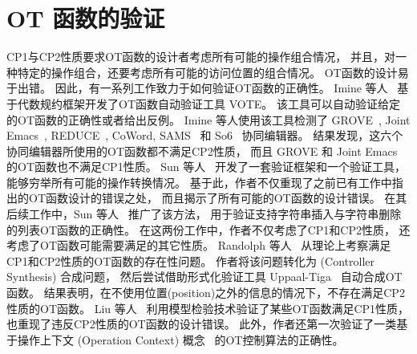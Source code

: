 \section{OT 函数的验证}

CP1与CP2性质要求OT函数的设计者考虑所有可能的操作组合情况，
并且，对一种特定的操作组合，还要考虑所有可能的访问位置的组合情况。
OT函数的设计易于出错。
因此，有一系列工作致力于如何验证OT函数的正确性。
Imine 等人~\cite{Imine:TCS06} 基于代数规约框架开发了OT函数自动验证工具 VOTE。
该工具可以自动验证给定的OT函数的正确性或者给出反例。
Imine 等人使用该工具检测了 GROVE~\cite{Ellis:SIGMOD89}, 
Joint Emacs~\cite{Ressel:CSCW96}, REDUCE~\cite{Sun:TOCHI98}, 
CoWord, SAMS~\cite{Molli:CSCW02} 和 So6~\cite{Sun:CSCW04} 协同编辑器。
结果发现，这六个协同编辑器所使用的OT函数都不满足CP2性质，
而且 GROVE 和 Joint Emacs 的OT函数也不满足CP1性质。
Sun 等人~\cite{Sun:CSCW14} 开发了一套验证框架和一个验证工具，
能够穷举所有可能的操作转换情况。
基于此，作者不仅重现了之前已有工作中指出的OT函数设计的错误之处，
而且揭示了所有可能的OT函数的设计错误。
在其后续工作中，Sun 等人~\cite{Sun:CSCW17} 推广了该方法，
用于验证支持字符串插入与字符串删除的列表OT函数的正确性。
在这两份工作中，作者不仅考虑了CP1和CP2性质，
还考虑了OT函数可能需要满足的其它性质。
Randolph 等人~\cite{Randolph:arXiv13} 从理论上考察满足CP1和CP2性质的OT函数的存在性问题。
作者将该问题转化为 (Controller Synthesis) 合成问题，
然后尝试借助形式化验证工具 Uppaal-Tiga~\cite{Cassez:CONCUR05} 自动合成OT函数。
结果表明，在不使用位置(position)之外的信息的情况下，不存在满足CP2性质的OT函数。
Liu 等人~\cite{Liu:FM14} 利用模型检验技术验证了某些OT函数满足CP1性质，
也重现了违反CP2性质的OT函数的设计错误。
此外，作者还第一次验证了一类基于操作上下文 (Operation Context) 概念~\cite{Sun:CSCW06} 的OT控制算法的正确性。